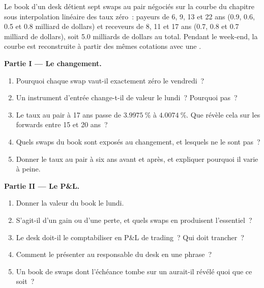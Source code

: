 \begin{problem}\label{pb:rc:curve-construction:1}
Le book d'un desk détient sept swaps au pair négociés sur la courbe du chapitre sous
interpolation linéaire des taux zéro~: payeurs de 6, 9, 13 et 22 ans (0.9, 0.6, 0.5
et 0.8 milliard de dollars) et receveurs de 8, 11 et 17 ans (0.7, 0.8 et 0.7
milliard de dollars), soit 5.0 milliards de dollars au total. Pendant le week-end, la courbe est reconstruite à partir des
mêmes cotations avec une .

\medskip\noindent\textbf{Partie I --- Le changement.}
\begin{enumerate}
\item Pourquoi chaque swap vaut-il exactement zéro le vendredi~?
\item Un instrument d'entrée change-t-il de valeur le lundi~? Pourquoi pas~?
\item Le taux au pair à 17 ans passe de $3.9975~\%$ à $4.0074~\%$. Que révèle cela
sur les forwards entre 15 et 20 ans~?
\item Quels swaps du book sont exposés au changement, et lesquels ne le sont pas~?
\item Donner le taux au pair à six ans avant et après, et expliquer pourquoi il
varie à peine.
\end{enumerate}

\medskip\noindent\textbf{Partie II --- Le P\&L.}
\begin{enumerate}[resume]
\item Donner la valeur du book le lundi.
\item S'agit-il d'un gain ou d'une perte, et quels swaps en produisent l'essentiel~?
\item Le desk doit-il le comptabiliser en P\&L de trading~? Qui doit trancher~?
\item Comment le présenter au responsable du desk en une phrase~?
\item Un book de swaps dont l'échéance tombe sur un  aurait-il révélé quoi que ce soit~?
\end{enumerate}


\end{problem}
